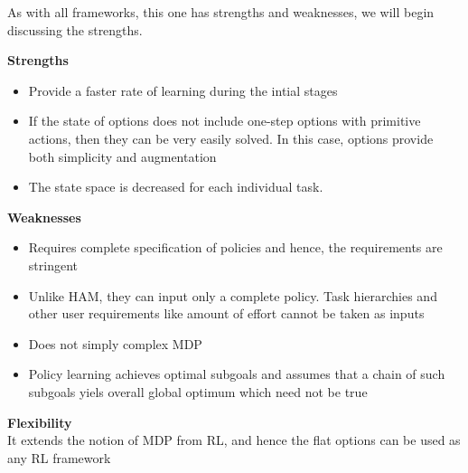 As with all frameworks, this one has strengths and weaknesses, we will begin discussing the strengths.

\textbf{Strengths}
\begin{itemize}
    \item Provide a faster rate of learning during the intial stages
    \item If the state of options does not include one-step options with primitive actions, then they can be very easily solved. In this case, options provide both simplicity and augmentation
    \item The state space is decreased for each individual task.
\end{itemize}

\textbf{Weaknesses}
\begin{itemize}
    \item Requires complete specification of policies and hence, the requirements are stringent
    \item Unlike HAM, they can input only a complete policy. Task hierarchies and other user requirements like amount of effort cannot be taken as inputs
    \item Does not simply complex MDP
    \item Policy learning achieves optimal subgoals and assumes that a chain of such subgoals yiels overall global optimum which need not be true
\end{itemize}

\textbf{Flexibility} \\
It extends the notion of MDP from RL, and hence the flat options can be used as any RL framework
